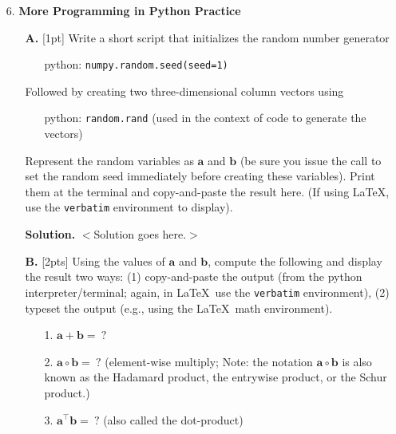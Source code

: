 \documentclass[10pt]{article}
\begin{document}
\begin{enumerate}
\begin{itemize}
\end{itemize}

{\bf Solution.} $<$Solution goes here.$>$

\newpage
\item[6.] 
{\bf More Programming in Python Practice}

\begin{itemize}
\item[{\bf A.}]  [1pt]
Write a short script that initializes the random number generator
\begin{itemize}
\item[] python: {\tt numpy.random.seed(seed=1)}
\end{itemize}
Followed by creating two three-dimensional column vectors using
\begin{itemize}
\item[] python: {\tt random.rand} (used in the context of code to generate the vectors)
\end{itemize}
Represent the random variables as $\mathbf{a}$ and $\mathbf{b}$ (be sure you issue the call to set the random seed immediately before creating these variables).  Print them at the terminal and copy-and-paste the result here. (If using \LaTeX, use the {\tt verbatim} environment to display).

{\bf Solution.} $<$Solution goes here.$>$


\item[{\bf B.}]  [2pts]
Using the values of $\mathbf{a}$ and $\mathbf{b}$, compute the following and display the result two ways: (1) copy-and-paste the output (from the python interpreter/terminal; again, in \LaTeX~use the {\tt verbatim} environment), (2) typeset the output (e.g., using the \LaTeX~math environment).
\begin{enumerate}
\item[1.] $\mathbf{a} + \mathbf{b} = ~?$
\item[2.] $\mathbf{a} \circ \mathbf{b} = ~?$  (element-wise multiply; Note: the notation $\mathbf{a} \circ \mathbf{b}$ is also known as the Hadamard product, the entrywise product, or the Schur product.)
\item[3.] $\mathbf{a}^\top \mathbf{b} = ~?$  (also called the dot-product)
\end{enumerate}


\end{itemize}
\end{enumerate}
\end{document}
